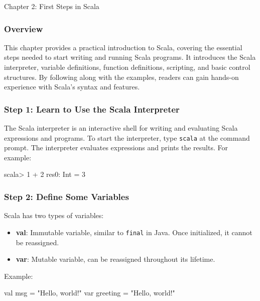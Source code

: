 \begin{notes}{Chapter 2: First Steps in Scala}
    \subsubsection*{Overview}

    This chapter provides a practical introduction to Scala, covering the essential steps needed to start writing and running Scala programs. It introduces the Scala interpreter, variable definitions, 
    function definitions, scripting, and basic control structures. By following along with the examples, readers can gain hands-on experience with Scala's syntax and features.

    \subsubsection*{Step 1: Learn to Use the Scala Interpreter}

    The Scala interpreter is an interactive shell for writing and evaluating Scala expressions and programs. To start the interpreter, type \texttt{scala} at the command prompt. The interpreter evaluates 
    expressions and prints the results. For example:

    \begin{highlight}
    \begin{code}[Scala]
    scala> 1 + 2
    res0: Int = 3
    \end{code}
    \end{highlight}

    \subsubsection*{Step 2: Define Some Variables}

    Scala has two types of variables:

    \begin{itemize}
        \item \textbf{val}: Immutable variable, similar to \texttt{final} in Java. Once initialized, it cannot be reassigned.
        \item \textbf{var}: Mutable variable, can be reassigned throughout its lifetime.
    \end{itemize}

    Example:

    \begin{highlight}
    \begin{code}[Scala]
    val msg = "Hello, world!"
    var greeting = "Hello, world!"
    \end{code}
    \end{highlight}


\end{notes}
